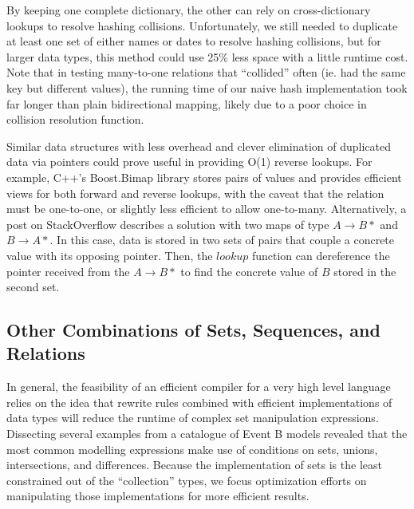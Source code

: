 \documentclass{article}
\begin{document}
By keeping one complete dictionary, the other can rely on cross-dictionary lookups to resolve hashing collisions. Unfortunately, we still needed to duplicate at least one set of either names or dates to resolve hashing collisions, but for larger data types, this method could use 25\% less space with a little runtime cost. Note that in testing many-to-one relations that ``collided'' often (ie. had the same key but different values), the running time of our naive hash implementation took far longer than plain bidirectional mapping, likely due to a poor choice in collision resolution function.

Similar data structures with less overhead and clever elimination of duplicated data via pointers could prove useful in providing O(1) reverse lookups. For example, C++'s Boost.Bimap library \cite{boostBimap1, boostBimap2} stores pairs of values and provides efficient views for both forward and reverse lookups, with the caveat that the relation must be one-to-one, or slightly less efficient to allow one-to-many. Alternatively, a post on StackOverflow \cite{bimapStackOverflow} describes a solution with two maps of type $A \rightarrow B*$ and $B \rightarrow A*$. In this case, data is stored in two sets of pairs that couple a concrete value with its opposing pointer. Then, the $lookup$ function can dereference the pointer received from the $A \rightarrow B*$ to find the concrete value of $B$ stored in the second set.



\subsection{Other Combinations of Sets, Sequences, and Relations}

In general, the feasibility of an efficient compiler for a very high level language relies on the idea that rewrite rules combined with efficient implementations of data types will reduce the runtime of complex set manipulation expressions. Dissecting several examples from a catalogue of Event B models revealed that the most common modelling expressions make use of conditions on sets, unions, intersections, and differences. Because the implementation of sets is the least constrained out of the ``collection'' types, we focus optimization efforts on manipulating those implementations for more efficient results.
\end{document}
